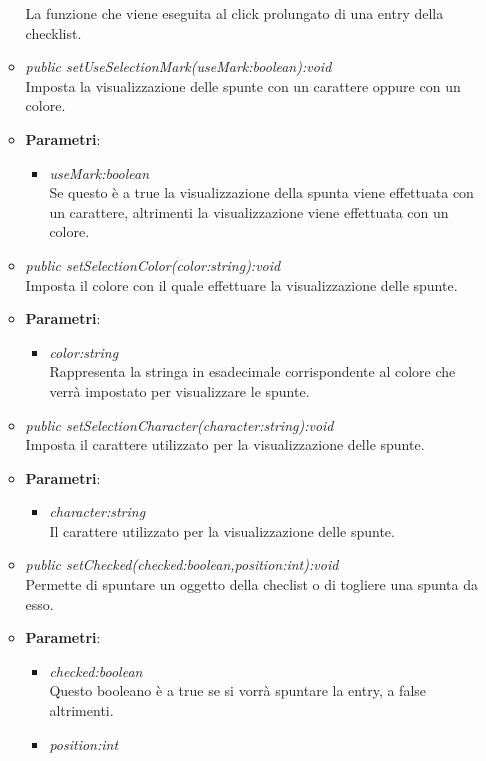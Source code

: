 \begin{itemize}
\begin{itemize}
{\begin{itemize}
		La funzione che viene eseguita al click prolungato di una entry della checklist.
		\end{itemize}}
\item \textit{public setUseSelectionMark(useMark:boolean):void}\\
	Imposta la visualizzazione delle spunte con un carattere oppure con un colore.
		\item{\textbf{Parametri}: \begin{itemize}
		\item \textit{useMark:boolean}\\
		Se questo è a true la visualizzazione della spunta viene effettuata con un carattere, altrimenti la visualizzazione viene effettuata con un colore.
		\end{itemize}} 
	\item \textit{public setSelectionColor(color:string):void}\\
	Imposta il colore con il quale effettuare la visualizzazione delle spunte.
		\item{\textbf{Parametri}: \begin{itemize}
		\item \textit{color:string}\\
		Rappresenta la stringa in esadecimale corrispondente al colore che verrà impostato per visualizzare le spunte.
		\end{itemize}} 
	\item \textit{public setSelectionCharacter(character:string):void}\\
	Imposta il carattere utilizzato per la visualizzazione delle spunte.
		\item{\textbf{Parametri}: \begin{itemize}
		\item \textit{character:string}\\
		Il carattere utilizzato per la visualizzazione delle spunte.
		\end{itemize}}  
	\item \textit{public setChecked(checked:boolean,position:int):void}\\
	Permette di spuntare un oggetto della checlist o di togliere una spunta da esso.
		\item{\textbf{Parametri}: \begin{itemize}
		\item \textit{checked:boolean}\\
		Questo booleano è a true se si vorrà spuntare la entry, a false altrimenti.
		\item \textit{position:int}\\

\end{itemize}}
\end{itemize}
\end{itemize}
